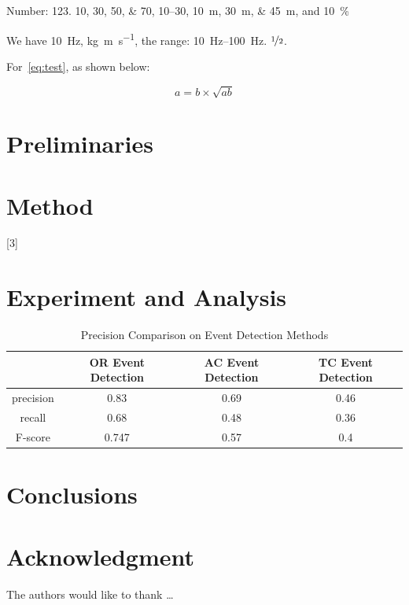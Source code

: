 Number:
\num{123}.
\numlist{10;30;50;70},
\numrange{10}{30},
\SIlist{10;30;45}{\metre},
and
\SI{10}{\percent}



\begin{ConferenceOnly}
We have \SI{10}{\hertz},
\si{\kilogram\metre\per\second},
the range: \SIrange{10}{100}{\hertz}.
$\nicefrac[]{1}{2}$.


\end{ConferenceOnly}


For~\cref{eq:test},
as shown below:

\begin{equation}\label{eq:test}
a = b \times \sqrt{ab}
\end{equation}

\blindmathpaper

\section{Preliminaries} \label{sec-preliminaries}

\blindtext

\gliMarker  %


\section{Method} \label{sec-method}

\blindtext
{}[3]
\blinditemize
\blindenumerate

\blindmathtrue
\blindmathfalse
\blinddescription

\qwuMarker %

\section{Experiment and Analysis} \label{sec-experiment}


\begin{table}  \centering
  \caption{Precision Comparison on Event Detection Methods}
  \label{tbl:overall-experiments}
  \begin{tabular}{cccc}
\toprule
    & OR Event Detection & AC Event Detection & TC Event Detection \\
\midrule
    precision & 0.83 & 0.69 & 0.46 \\
    recall & 0.68 & 0.48 & 0.36 \\
    F-score & 0.747 & 0.57 & 0.4 \\
\bottomrule
\end{tabular}
\end{table}


\section{Conclusions} \label{sec-conclusions}

\blindtext

\section*{Acknowledgment}

\lipsum[1]


The authors would like to thank \ldots

